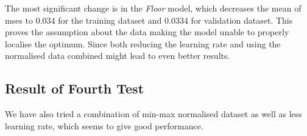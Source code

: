 
The most significant change is in the \textit{Floor} model, which decreases the mean of \gls{mse}s to 0.034 for the training dataset and 0.0334 for validation dataset. This proves the assumption about the data making the model unable to properly localise the optimum. Since both reducing the learning rate and using the normalised data combined might lead to even better results. 


\subsection{Result of Fourth Test}
We have also tried a combination of min-max normalised dataset as well as less learning rate, which seems to give good performance. 

